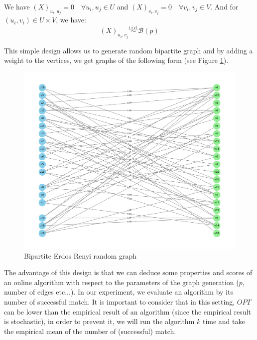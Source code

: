 \documentclass[12pt, twocolumn]{article}
\begin{document}
\par
\hspace{\parindent}We have $(X)_{u_i,u_j} = 0 \quad \forall u_i, u_j \in U$ and $(X)_{v_i,v_j} = 0 \quad \forall v_i, v_j \in V$. And for $(u_i, v_i) \in U \times V$, we have:
\[(X)_{u_i,v_j} \overset{\text{i.i.d.}}{\sim} \mathcal{B}(p)\]

\par
\hspace{\parindent}This simple design allows us to generate random bipartite graph and by adding a weight to the vertices, we get graphs of the following form (see Figure \ref{fig:erdos}).

\begin{figure}
    \centering
    \includegraphics[width=1\linewidth]{img/graph_example.pdf}
    \caption{Bipartite Erdos Renyi random graph}
    \label{fig:erdos}
\end{figure}

\par
\hspace{\parindent}The advantage of this design is that we can deduce some properties and scores of an online algorithm with respect to the parameters of the graph generation ($p$, number of edges etc...). In our experiment, we evaluate an algorithm by its number of successful match. It is important to consider that in this setting, $OPT$ can be lower than the empirical result of an algorithm (since the empirical result is stochastic), in order to prevent it, we will run the algorithm $k$ time and take the empirical mean of the number of (successful) match. 
\end{document}
